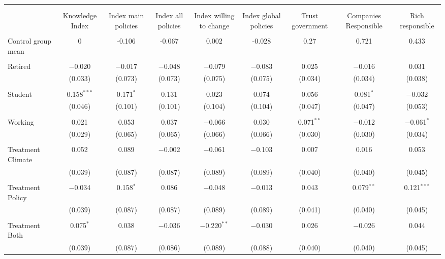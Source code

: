 
\begin{tabular}{@{\extracolsep{5pt}}lcccccccc} 
\\[-1.8ex]\hline 
\hline \\[-1.8ex] 
\\[-1.8ex] & Knowledge Index & Index main policies & Index all policies & Index willing to change & Index global policies & Trust government & Companies Responsible & Rich responsible \\ 
\hline \\[-1.8ex] 
 Control group mean & 0 & -0.106 & -0.067 & 0.002 & -0.028 & 0.27 & 0.721 & 0.433  \\ \hline \\[-1.8ex] Retired & $-$0.020 & $-$0.017 & $-$0.048 & $-$0.079 & $-$0.083 & 0.025 & $-$0.016 & 0.031 \\ 
  & (0.033) & (0.073) & (0.073) & (0.075) & (0.075) & (0.034) & (0.034) & (0.038) \\ 
  & & & & & & & & \\ 
 Student & 0.158$^{***}$ & 0.171$^{*}$ & 0.131 & 0.023 & 0.074 & 0.056 & 0.081$^{*}$ & $-$0.032 \\ 
  & (0.046) & (0.101) & (0.101) & (0.104) & (0.104) & (0.047) & (0.047) & (0.053) \\ 
  & & & & & & & & \\ 
 Working & 0.021 & 0.053 & 0.037 & $-$0.066 & 0.030 & 0.071$^{**}$ & $-$0.012 & $-$0.061$^{*}$ \\ 
  & (0.029) & (0.065) & (0.065) & (0.066) & (0.066) & (0.030) & (0.030) & (0.034) \\ 
  & & & & & & & & \\ 
 Treatment Climate & 0.052 & 0.089 & $-$0.002 & $-$0.061 & $-$0.103 & 0.007 & 0.016 & 0.053 \\ 
  & (0.039) & (0.087) & (0.087) & (0.089) & (0.089) & (0.040) & (0.040) & (0.045) \\ 
  & & & & & & & & \\ 
 Treatment Policy & $-$0.034 & 0.158$^{*}$ & 0.086 & $-$0.048 & $-$0.013 & 0.043 & 0.079$^{**}$ & 0.121$^{***}$ \\ 
  & (0.039) & (0.087) & (0.087) & (0.089) & (0.089) & (0.041) & (0.040) & (0.045) \\ 
  & & & & & & & & \\ 
 Treatment Both & 0.075$^{*}$ & 0.038 & $-$0.036 & $-$0.220$^{**}$ & $-$0.030 & 0.026 & $-$0.026 & 0.044 \\ 
  & (0.039) & (0.087) & (0.086) & (0.089) & (0.088) & (0.040) & (0.040) & (0.045) \\ 

\end{tabular}
